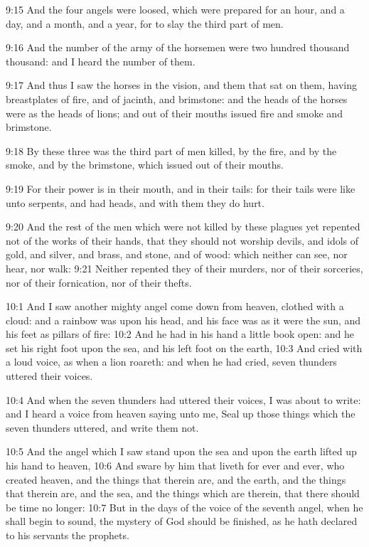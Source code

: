 9:15 And the four angels were loosed, which were prepared for an hour,
and a day, and a month, and a year, for to slay the third part of men.

9:16 And the number of the army of the horsemen were two hundred
thousand thousand: and I heard the number of them.

9:17 And thus I saw the horses in the vision, and them that sat on
them, having breastplates of fire, and of jacinth, and brimstone: and
the heads of the horses were as the heads of lions; and out of their
mouths issued fire and smoke and brimstone.

9:18 By these three was the third part of men killed, by the fire, and
by the smoke, and by the brimstone, which issued out of their mouths.

9:19 For their power is in their mouth, and in their tails: for their
tails were like unto serpents, and had heads, and with them they do
hurt.

9:20 And the rest of the men which were not killed by these plagues
yet repented not of the works of their hands, that they should not
worship devils, and idols of gold, and silver, and brass, and stone,
and of wood: which neither can see, nor hear, nor walk: 9:21 Neither
repented they of their murders, nor of their sorceries, nor of their
fornication, nor of their thefts.

10:1 And I saw another mighty angel come down from heaven, clothed
with a cloud: and a rainbow was upon his head, and his face was as it
were the sun, and his feet as pillars of fire: 10:2 And he had in his
hand a little book open: and he set his right foot upon the sea, and
his left foot on the earth, 10:3 And cried with a loud voice, as when
a lion roareth: and when he had cried, seven thunders uttered their
voices.

10:4 And when the seven thunders had uttered their voices, I was about
to write: and I heard a voice from heaven saying unto me, Seal up
those things which the seven thunders uttered, and write them not.

10:5 And the angel which I saw stand upon the sea and upon the earth
lifted up his hand to heaven, 10:6 And sware by him that liveth for
ever and ever, who created heaven, and the things that therein are,
and the earth, and the things that therein are, and the sea, and the
things which are therein, that there should be time no longer: 10:7
But in the days of the voice of the seventh angel, when he shall begin
to sound, the mystery of God should be finished, as he hath declared
to his servants the prophets.

